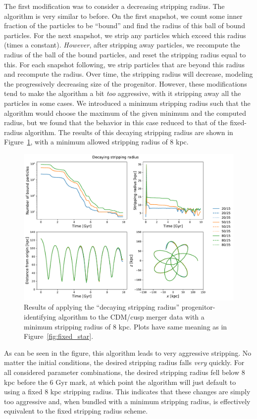 The first modification was to consider a decreasing stripping radius.  The
algorithm is very similar to before.  On the first snapshot, we count some
inner fraction of the particles to be ``bound'' and find the radius of this
ball of bound particles.  For the next snapshot, we strip any particles
which exceed this radius (times a constant).  \textit{However}, after
stripping away particles, we recompute the radius of the ball of the bound
particles, and reset the stripping radius equal to this. For each snapshot
following, we strip particles that are beyond this radius and recompute the
radius.  Over time, the stripping radius will decrease, modeling the
progressively decreasing size of the progenitor.  However, these modifications
tend to make the algorithm a bit \textit{too} aggressive, with it stripping
away all the particles in some cases.  We introduced a minimum stripping
radius such that the algorithm would choose the maximum of the given minimum and
the computed radius, but we found that the behavior in this case reduced to that
of the fixed-radius algorithm. The results of this decaying stripping radius are
shown in Figure~\ref{fig:decay_star}, with a minimum allowed stripping radius
of 8 kpc.

\begin{figure}
    \centering
    \includegraphics[width=0.9\linewidth]{figs/decay_star.pdf}
    \caption{%
        Results of applying the ``decaying stripping radius''
        progenitor-identifying algorithm to the CDM/cusp merger data with a
        minimum stripping radius of 8 kpc.  Plots have same meaning as in
        Figure~\ref{fig:fixed_star}.
    }
    \label{fig:decay_star}
\end{figure}

As can be seen in the figure, this algorithm leads to very aggressive stripping.
No matter the initial conditions, the desired stripping radius falls
\textit{very} quickly. For all considered parameter combinations, the desired
stripping radius fell below 8 kpc before the 6 Gyr mark, at which point the
algorithm will just default to using a fixed 8 kpc stripping radius. This
indicates that these changes are simply too aggressive and, when bundled with a
minimum stripping radius, is effectively equivalent to the fixed stripping
radius scheme.

